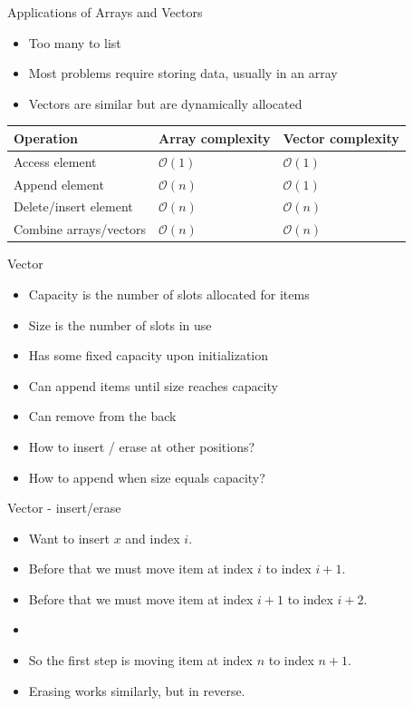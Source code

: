 \documentclass{beamer}
\begin{document}
\begin{frame}[plain]{Applications of Arrays and Vectors}
    \begin{itemize}
        \item Too many to list
        \item Most problems require storing data, usually in an array
        \item Vectors are similar but are dynamically allocated
    \end{itemize}
    \vspace*{1cm}
    \begin{center}
    \begin{tabular}{l|l|l}
    Operation & Array complexity & Vector complexity \\ \hline
    Access element & $\mathcal{O}(1)$ & $\mathcal{O}(1)$ \\
    Append element & $\mathcal{O}(n)$ & $\mathcal{O}(1)$ \\
    Delete/insert element & $\mathcal{O}(n)$ & $\mathcal{O}(n)$ \\
    Combine arrays/vectors & $\mathcal{O}(n)$ & $\mathcal{O}(n)$ \\
    \end{tabular}
    \end{center}
\end{frame}

\begin{frame}[plain]{Vector}
    \begin{itemize}
        \item Capacity is the number of slots allocated for items
        \item Size is the number of slots in use
        \item Has some fixed capacity upon initialization
        \item Can append items until size reaches capacity
        \item Can remove from the back
        \item How to insert / erase at other positions?
        \item How to append when size equals capacity?
    \end{itemize}
\end{frame}

\begin{frame}[plain]{Vector - insert/erase}
    \begin{itemize}
        \item Want to insert $x$ and index $i$.
        \item Before that we must move item at index $i$ to index $i+1$.
        \item Before that we must move item at index $i+1$ to index $i+2$.
        \item \textellipsis
        \item So the first step is moving item at index $n$ to index $n+1$.
        \item Erasing works similarly, but in reverse.
    \end{itemize}
\end{frame}
\end{document}

